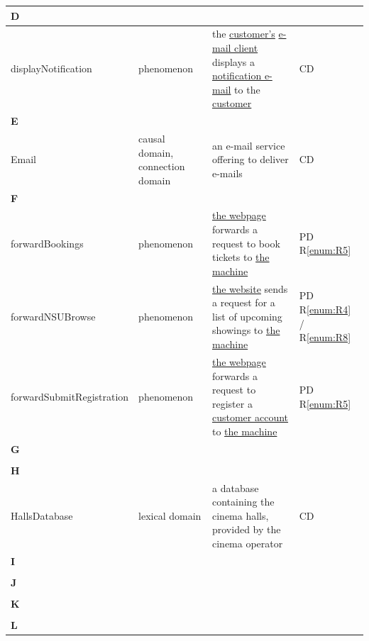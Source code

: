 \documentclass[a4paper,10pt,titlepage,bibtotoc,bibtotocnumbered]{scrreprt}
\begin{document}
\begin{longtable}{|l|p{3cm}|p{5cm}|l|}
\hline
\multicolumn{4}{|l|}{\textbf{D}}\\
\hline
\hypertarget{glossary:displayNotification}{displayNotification} & phenomenon & the \hyperlink{glossary:Customer}{customer's} \hyperlink{glossary:Email}{e-mail client} displays a \hyperlink{glossary:notifyCustomer}{notification e-mail} to the \hyperlink{glossary:Customer}{customer} & CD\\
\hline
\multicolumn{4}{|l|}{\textbf{E}}\\
\hline
\hypertarget{glossary:Email}{Email} & causal domain, connection domain & an e-mail service offering to deliver e-mails & CD\\
\hline
\multicolumn{4}{|l|}{\textbf{F}}\\
\hline
\hypertarget{glossary:forwardBookings}{forwardBookings} & phenomenon & \hyperlink{glossary:WebpageBookTickets}{the webpage} forwards a request to book tickets to \hyperlink{glossary:UDEKino}{the machine} & PD R\ref{enum:R5}\\
\hline
\hypertarget{glossary:forwardNSUBrowse}{forwardNSUBrowse} & phenomenon & \hyperlink{glossary:WebPageNonStaffUserBrowse}{the website} sends a request for a list of upcoming showings to \hyperlink{glossary:UDEK-NonStaffUserBrowse}{the machine} & PD R\ref{enum:R4} / R\ref{enum:R8}\\
\hline
\hypertarget{glossary:forwardSubmitRegistration}{forwardSubmitRegistration} & phenomenon & \hyperlink{glossary:WebpageRegisterCustomer}{the webpage} forwards a request to register a \hyperlink{glossary:Customer}{customer account} to \hyperlink{glossary:UDEKino}{the machine} & PD R\ref{enum:R5}\\
\hline
\multicolumn{4}{|l|}{\textbf{G}}\\
\hline
&  &  & \\
\hline
\multicolumn{4}{|l|}{\textbf{H}}\\
\hline
\hypertarget{glossary:HallsDatabase}{HallsDatabase} & lexical domain & a database containing the cinema halls, provided by the cinema operator & CD\\
\hline
\multicolumn{4}{|l|}{\textbf{I}}\\
\hline
&  &  & \\
\hline
\multicolumn{4}{|l|}{\textbf{J}}\\
\hline
&  &  & \\
\hline
\multicolumn{4}{|l|}{\textbf{K}}\\
\hline
&  &  & \\
\hline
\multicolumn{4}{|l|}{\textbf{L}}\\

\end{longtable}
\end{document}
